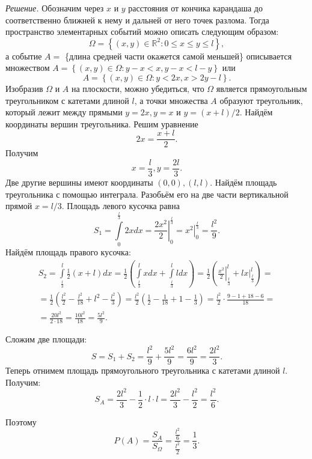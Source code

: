 \textit{Решение.} Обозначим через $x$ и $y$ расстояния от кончика карандаша до соответственно ближней к нему и дальней от него точек разлома.
Тогда пространство элементарных событий можно описать следующим образом:
$$ \Omega =
\left\{ \left( x, y \right) \in \mathbb{R}^2:
0 \leq x \leq y \leq l \right\},$$
а событие $A =$
\{длина средней части окажется самой меньшей\} описывается множеством $A = \left\{ \left( x, y \right) \in \Omega: y - x < x, y - x < l - y \right\} $ или
$$A =
\left\{ \left( x, y \right) \in \Omega:
y < 2x,
x > 2y - l \right\}.$$ 
Изобразив $ \Omega $ и $A$ на плоскости,
можно убедиться,
что $ \Omega $ является прямоугольным треугольником с катетами длиной $l$,
а точки множества $A$ образуют треугольник, который лежит между прямыми $y = 2x, y = x$ и $y = \left( x+l \right) /2$.
Найдём координаты вершин треугольника.
Решим уравнение
$$2x = \frac{x+l}{2}.$$
Получим
$$x = \frac{l}{3}, y = \frac{2l}{3}.$$
Две другие вершины имеют координаты $ \left( 0, 0 \right), \left( l, l \right)$.
Найдём площадь треугольника с помощью интеграла.
Разобьём его на две части вертикальной прямой $x = l/3$.
Площадь левого кусочка равна 
$$S_1 =
\int \limits_{0}^{ \frac{l}{3} } 2 x dx =
\left. \frac{2x^2}{2} \right|_0^{ \frac{l}{3} } =
\left. x^2 \right|_0^{ \frac{l}{3} } =
\frac{l^2}{9}.$$
Найдём площадь правого кусочка:
\begin{equation*}
\begin{split}
S_2 =
\int \limits_{ \frac{l}{3} }^l \frac{1}{2} \left( x+l \right) dx =
\frac{1}{2} \left( \int \limits_{ \frac{l}{3} }^l x dx + \int \limits_{ \frac{l}{3} }^l l dx \right) =
\frac{1}{2} \left( \left. \frac{x^2}{2} \right|_{ \frac{l}{3} }^l + \left. lx \right|_{ \frac{l}{3} }^l \right) = \\
= \frac{1}{2} \left( \frac{l^2}{2} - \frac{l^2}{18} + l^2 - \frac{l^2}{3} \right) =
\frac{l^2}{2} \left( \frac{1}{2} - \frac{1}{18} + 1 - \frac{1}{3} \right) =
\frac{l^2}{2} \cdot \frac{9-1+18-6}{18} = \\
= \frac{20 l^2}{2 \cdot 18} =
\frac{10 l^2}{18} =
\frac{5 l^2}{9}.
\end{split}
\end{equation*}

Сложим две площади:
$$S =
S_1 + S_2 = 
\frac{l^2}{9} + \frac{5 l^2}{9} =
\frac{6 l^2}{9} =
\frac{2 l^2}{3}.$$
Теперь отнимем площадь прямоугольного треугольника с катетами длиной $l$.
Получим:
$$S_A =
\frac{2 l^2}{3} - \frac{1}{2} \cdot l \cdot l =
\frac{2 l^2}{3} - \frac{l^2}{2} =
\frac{l^2}{6}.$$

Поэтому
$$P \left( A \right) =
\frac{S_A}{S_{ \Omega }} =
\frac{ \frac{l^2}{6} }{ \frac{l^2}{2} } =
\frac{1}{3}.$$

